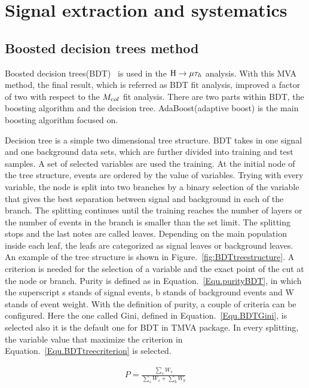 
\chapter{Signal extraction and systematics}

\section{Boosted decision trees method} \label{BDTchaper}
Boosted decision trees(BDT)~\cite{BDTboostPI,TMVAnote} is used in the $\mathrm{H}\to \mu\tau_{h}$ analysis. With this MVA method, the final result, which is referred as BDT fit analysis, improved a factor of two with respect to the $M_{col}$ fit analysis. There are two parts within BDT, the boosting algorithm and the decision tree. AdaBoost(adaptive boost) is the main boosting algorithm focused on. 

Decision tree is a simple two dimensional tree structure. BDT takes in one signal and one background data sets, which are further divided into training and test samples. A set of selected variables are used the training. At the initial node of the tree structure, events are ordered by the value of variables. Trying with every variable, the node is split into two branches by a binary selection of the variable that gives the best separation between signal and background in each of the branch. The splitting continues until the training reaches the number of layers or the number of events in the branch is smaller than the set limit. The splitting stops and the last notes are called leaves. Depending on the main population inside each leaf, the leafs are categorized as signal leaves or background leaves. An example of the tree structure is shown in Figure.~\ref{fig:BDTtreestructure}.  A criterion is needed for the selection of a variable and the exact point of the cut at the node or branch. Purity is defined as in Equation.~\ref{Equ.purityBDT}, in which the superscript s stands of signal events, b stands of background events and W stands of event weight. With the definition of purity, a couple of criteria can be configured. Here the one called Gini, defined in Equation.~\ref{Equ.BDTGini}, is selected also it is the default one for BDT in TMVA package. In every splitting, the variable value that maximize the criterion in Equation.~\ref{Equ.BDTtreecriterion} is selected.  


\begin{align} \label{Equ.purityBDT}
P=\frac{\sum_{s}W_{s}}{\sum_{s}W_{s}+\sum_{b}W_{b}}
\end{align}

